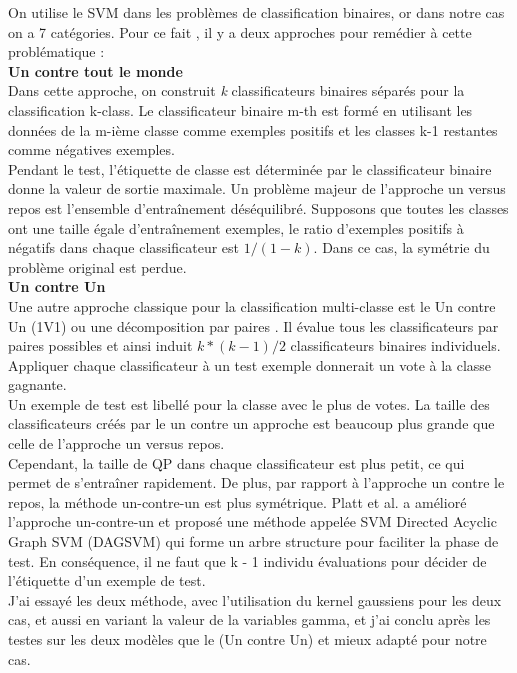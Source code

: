 On utilise le SVM dans les problèmes de classification binaires, or dans notre cas on a 7 catégories.
Pour ce fait , il y a deux approches pour remédier à cette problématique :\\[1cm]
\textbf{Un contre tout le monde}\\[1cm]
Dans cette approche, on construit \textit{k} classificateurs  binaires séparés
pour la classification k-class. Le classificateur binaire m-th est formé en utilisant les données de
la m-ième classe comme exemples positifs et les classes k-1 restantes comme négatives
exemples.\\[0.2cm]
Pendant le test, l'étiquette de classe est déterminée par le classificateur binaire
donne la valeur de sortie maximale. Un problème majeur de l'approche un versus repos est
l'ensemble d'entraînement déséquilibré. Supposons que toutes les classes ont une taille égale d'entraînement exemples, le ratio d'exemples positifs à négatifs dans chaque classificateur est
$ 1/(1-k) $. Dans ce cas, la symétrie du problème original est perdue. \\[1cm]
\textbf{Un contre Un}\\[1cm]
Une autre approche classique pour la classification multi-classe est le Un contre Un (1V1)
ou une décomposition par paires . Il évalue tous les classificateurs par paires possibles et ainsi
induit $ k *(k - 1) / 2 $ classificateurs binaires individuels. Appliquer chaque classificateur à un test
exemple donnerait un vote à la classe gagnante. \\[0.5cm]
Un exemple de test est libellé pour la classe avec le plus de votes. La taille des classificateurs créés par le un contre un approche est beaucoup plus grande que celle de l'approche un versus repos.\\[0.5cm] Cependant, la taille de QP dans chaque classificateur est plus petit, ce qui permet de s'entraîner rapidement. De plus, par rapport à l'approche un contre le repos, la méthode un-contre-un est plus
symétrique. Platt et al. a amélioré l'approche un-contre-un et proposé
une méthode appelée SVM Directed Acyclic Graph SVM (DAGSVM) qui forme un arbre
structure pour faciliter la phase de test. En conséquence, il ne faut que k - 1 individu
évaluations pour décider de l'étiquette d'un exemple de test.\\[0.5cm]
J'ai essayé les deux méthode, avec l'utilisation du kernel gaussiens pour les deux cas, et aussi en variant la valeur de la variables gamma, et j'ai conclu après les testes sur les deux modèles que le (Un contre Un) et mieux adapté pour notre cas.\\
